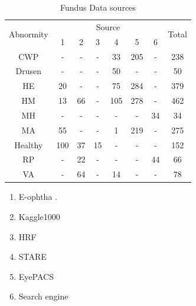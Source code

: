 \documentclass{article}
\begin{document}
	\begin{minipage}[t]{0.6\linewidth}
		{
			\fontsize{9}{12}\selectfont
			{
				\begin{longtable}{cccccccc}
					\caption{Fundus Data sources}
					\label{tb:Fundus_source}\\
					\toprule
					\multirow{2}{*}{Abnormity}&\multicolumn{6}{c}{Source}&\multirow{2}{*}{Total}\\
					&1&2&3&4&5&6&\\
					\midrule
					CWP    &-  &- &- &33 &205&- &238\\
					Drusen &-  &- &- &50 &-  &- &50 \\     
					HE     &20 &- &- &75 &284&- &379\\ 
					HM     &13 &66&- &105&278&- &462\\     
					MH     &-  &- &- &-  &-  &34&34 \\        
					MA     &55 &- &- &1  &219&- &275\\
					Healthy&100&37&15&-  &-  &- &152\\      
					RP     &-  &22&- &-  &-  &44&66 \\         
					VA     &-  &64&- &14 &-  &- &78 \\
					
					\bottomrule
				\end{longtable}
				
				\vspace{1cm}
				\begin{enumerate}[left=1.5cm]
					
					\item E-ophtha \autocite{E_ophtha}.
					\vspace{-0.2cm}
					
					\item Kaggle1000 \autocite{1000Fundus_Pytorch_TransferLearning}
					\vspace{-0.2cm}
					
					\item HRF \autocite{HRF_2013}
					\vspace{-0.2cm}
					
					\item STARE \autocite{STARE}
					\vspace{-0.2cm}
					
					\item EyePACS \autocite{DR_dataset}
					\vspace{-0.2cm}
					
					\item Search engine
					\vspace{-0.2cm}
					
				\end{enumerate}
				
				\vspace{0.5cm}
			}
		}
	\end{minipage}
	
\end{document}
